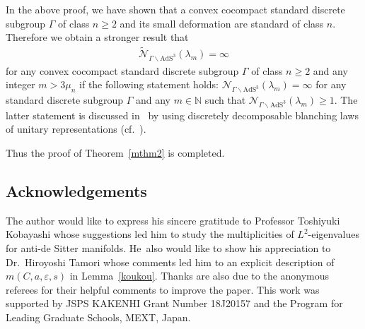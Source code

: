 \documentclass[pdftex]{sigma}
\numberwithin{equation}{section}
\begin{document}
\begin{Remark}
In the above proof, we have shown that a convex cocompact standard discrete subgroup
$\Gamma$ of class $n\geq 2$ and its small deformation are standard of class $n$.
Therefore we obtain a stronger result that
\begin{align*}
\widetilde{\mathcal{N}}_{\Gamma\backslash\mathrm{AdS}^{3}}(\lambda_{m})=\infty
\end{align*}
for any convex cocompact standard discrete subgroup
$\Gamma$ of class $n\geq 2$ and any integer $m>3\mu_{n}$
if the following statement holds:
$\mathcal{N}_{\Gamma\backslash\mathrm{AdS}^{3}}(\lambda_{m})=\infty$
for any standard discrete subgroup $\Gamma$ and any $m\in\mathbb{N}$ such that
$\mathcal{N}_{\Gamma\backslash\mathrm{AdS}^{3}}(\lambda_{m})\geq1$.
The latter statement is discussed in~\cite{AnaKaKob} by using discretely
decomposable blanching laws of unitary representations (cf.~\cite{KaKob19}).
\end{Remark}

Thus the proof of Theorem~\ref{mthm2} is completed.

\subsection*{Acknowledgements}
The author would like to express his sincere gratitude to
Professor Toshiyuki Kobayashi whose suggestions
led him to study the multiplicities of $L^2$-eigenvalues
for anti-de Sitter manifolds.
He~also would like to show his appreciation to Dr.\ Hiroyoshi Tamori
whose comments led him to an explicit description of $m(C,a,\varepsilon, s)$
in Lemma~\ref{koukou}.
Thanks are also due to the anonymous referees
for their helpful comments to improve the paper.
This work was supported by JSPS KAKENHI Grant Number 18J20157
and the Program for Leading Graduate Schools, MEXT, Japan.
\end{document}
